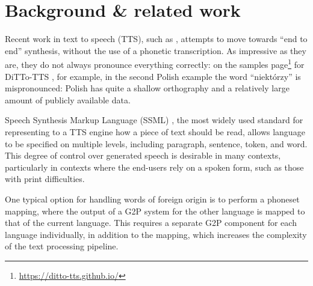 \documentclass[10pt, a4paper]{article}
\begin{document}

\section{Background \& related work}

Recent work in text to speech (TTS), such as \citet{gao2023e3tts}, attempts to move towards ``end to end'' synthesis, without the use of a phonetic transcription. As impressive as they are, they do not always pronounce everything correctly: on the samples page\footnote{\url{https://ditto-tts.github.io/}} for DiTTo-TTS \cite{lee2025dittotts}, for example, in the second Polish example the word ``niektórzy'' is mispronounced: Polish has quite a shallow orthography and a relatively large amount of publicly available data.

Speech Synthesis Markup Language (SSML) \cite{w3c:ssml11}, the most widely used standard for representing to a TTS engine how a piece of text should be read, allows language to be specified on multiple levels, including paragraph, sentence, token, and word. This degree of control over generated speech is desirable in many contexts, particularly in contexts where the end-users rely on a spoken form, such as those with print difficulties.

One typical option for handling words of foreign origin is to perform a phoneset mapping, where the output of a G2P system for the other language is mapped to that of the current language. This requires a separate G2P component for each language individually, in addition to the mapping, which increases the complexity of the text processing pipeline.


\end{document}
